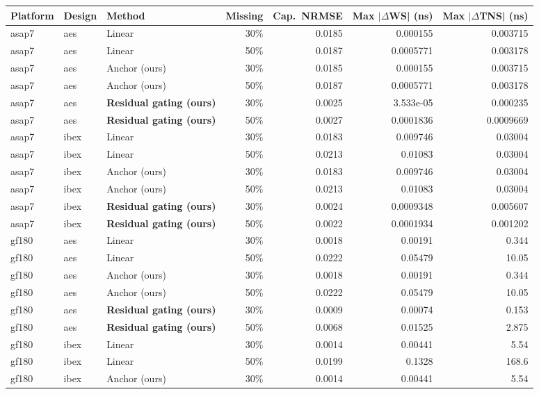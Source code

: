 \small
\setlength{\tabcolsep}{3pt}\scriptsize
\begin{tabular}{lllrrrr}\toprule
Platform & Design & Method & Missing & Cap.\ NRMSE & Max $|\Delta$WS| (ns) & Max $|\Delta$TNS| (ns) \\\midrule
asap7 & aes & Linear & 30\% & 0.0185 & 0.000155 & 0.003715 \\
asap7 & aes & Linear & 50\% & 0.0187 & 0.0005771 & 0.003178 \\
asap7 & aes & Anchor (ours) & 30\% & 0.0185 & 0.000155 & 0.003715 \\
asap7 & aes & Anchor (ours) & 50\% & 0.0187 & 0.0005771 & 0.003178 \\
asap7 & aes & \textbf{Residual gating (ours)} & 30\% & 0.0025 & 3.533e-05 & 0.000235 \\
asap7 & aes & \textbf{Residual gating (ours)} & 50\% & 0.0027 & 0.0001836 & 0.0009669 \\
\addlinespace
asap7 & ibex & Linear & 30\% & 0.0183 & 0.009746 & 0.03004 \\
asap7 & ibex & Linear & 50\% & 0.0213 & 0.01083 & 0.03004 \\
asap7 & ibex & Anchor (ours) & 30\% & 0.0183 & 0.009746 & 0.03004 \\
asap7 & ibex & Anchor (ours) & 50\% & 0.0213 & 0.01083 & 0.03004 \\
asap7 & ibex & \textbf{Residual gating (ours)} & 30\% & 0.0024 & 0.0009348 & 0.005607 \\
asap7 & ibex & \textbf{Residual gating (ours)} & 50\% & 0.0022 & 0.0001934 & 0.001202 \\
\addlinespace
\midrule
gf180 & aes & Linear & 30\% & 0.0018 & 0.00191 & 0.344 \\
gf180 & aes & Linear & 50\% & 0.0222 & 0.05479 & 10.05 \\
gf180 & aes & Anchor (ours) & 30\% & 0.0018 & 0.00191 & 0.344 \\
gf180 & aes & Anchor (ours) & 50\% & 0.0222 & 0.05479 & 10.05 \\
gf180 & aes & \textbf{Residual gating (ours)} & 30\% & 0.0009 & 0.00074 & 0.153 \\
gf180 & aes & \textbf{Residual gating (ours)} & 50\% & 0.0068 & 0.01525 & 2.875 \\
\addlinespace
gf180 & ibex & Linear & 30\% & 0.0014 & 0.00441 & 5.54 \\
gf180 & ibex & Linear & 50\% & 0.0199 & 0.1328 & 168.6 \\
gf180 & ibex & Anchor (ours) & 30\% & 0.0014 & 0.00441 & 5.54 \\

\end{tabular}
